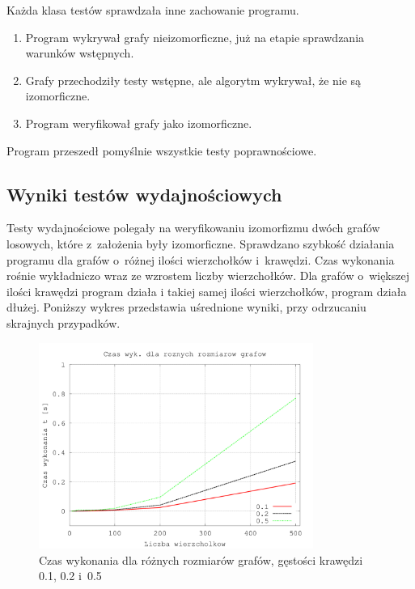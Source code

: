 \documentclass[12pt, a4paper, ]{article} %
\begin{document}
\noindent
Każda klasa testów sprawdzała inne zachowanie programu.
\begin{enumerate}[label=Ad. \arabic*]
  \item Program wykrywał grafy nieizomorficzne, już na etapie sprawdzania
    warunków wstępnych.
  \item Grafy przechodziły testy wstępne, ale algorytm wykrywał, że nie są izomorficzne.
  \item Program weryfikował grafy jako izomorficzne.
\end{enumerate}

Program przeszedł pomyślnie wszystkie testy poprawnościowe.
\subsection{Wyniki testów wydajnościowych}
Testy wydajnościowe polegały na weryfikowaniu izomorfizmu dwóch grafów losowych,
które z~założenia były izomorficzne. Sprawdzano szybkość działania programu dla
grafów o~różnej ilości wierzchołków i~krawędzi. Czas wykonania rośnie wykładniczo wraz
ze wzrostem liczby wierzchołków. Dla grafów o~większej ilości krawędzi program działa i
takiej samej ilości wierzchołków, program działa dłużej. Poniższy wykres przedstawia
uśrednione wyniki, przy odrzucaniu skrajnych przypadków.

\begin{figure}[!ht]
    \centering
    \includegraphics[width=0.8\textwidth]{rys1}
    \caption{Czas wykonania dla różnych rozmiarów grafów, gęstości krawędzi 0.1, 0.2 i~0.5}
    \label{fig:rys1}
\end{figure}
\end{document}

